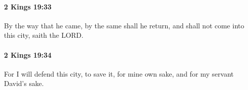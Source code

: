 		\paragraph{2 Kings 19:33} %
			\label{2KINGS-19-33}

			By the way that he came, by the same shall he return, and shall not come into this city, saith the LORD.


		\paragraph{2 Kings 19:34} %
			\label{2KINGS-19-34}

			For I will defend this city, to save it, for mine own sake, and for my servant David’s sake.


